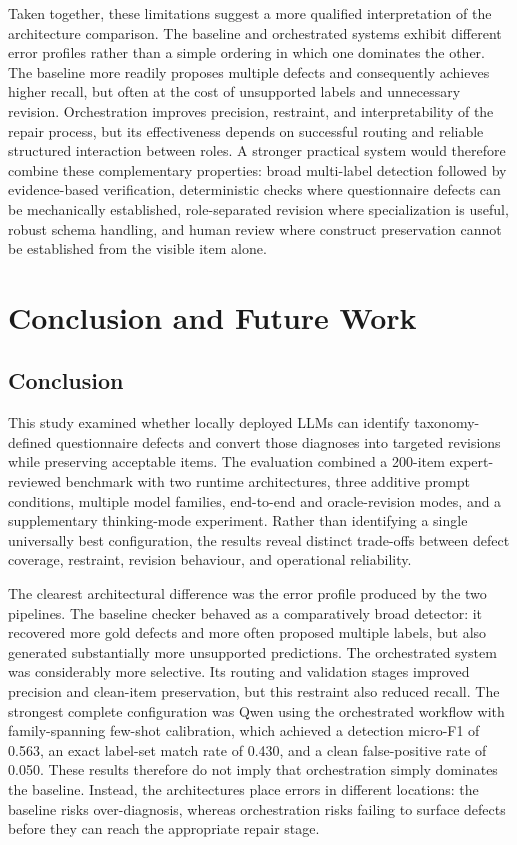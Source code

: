 \documentclass[11pt,a4paper]{article}
\begin{document}
Taken together, these limitations suggest a more qualified interpretation of the architecture comparison. The baseline and orchestrated systems exhibit different error profiles 
rather than a simple ordering in which one dominates the other. The baseline more readily proposes multiple defects and consequently achieves higher recall, but often at the cost of 
unsupported labels and unnecessary revision. Orchestration improves precision, restraint, and interpretability of the repair process, but its effectiveness depends on successful routing 
and reliable structured interaction between roles. A stronger practical system would therefore combine these complementary properties: broad multi-label detection followed by evidence-based 
verification, deterministic checks where questionnaire defects can be mechanically established, role-separated revision where specialization is useful, robust schema handling, 
and human review where construct preservation cannot be established from the visible item alone.


\section{Conclusion and Future Work}
\label{sec:conclusion}

\subsection{Conclusion}
\label{subsec:conclusion}

This study examined whether locally deployed LLMs can identify
taxonomy-defined questionnaire defects and convert those diagnoses into targeted
revisions while preserving acceptable items. The evaluation combined a
200-item expert-reviewed benchmark with two runtime architectures, three
additive prompt conditions, multiple model families, end-to-end and
oracle-revision modes, and a supplementary thinking-mode experiment. Rather
than identifying a single universally best configuration, the results reveal
distinct trade-offs between defect coverage, restraint, revision behaviour, and
operational reliability.

The clearest architectural difference was the error profile produced by the two
pipelines. The baseline checker behaved as a comparatively broad detector: it
recovered more gold defects and more often proposed multiple labels, but also
generated substantially more unsupported predictions. The orchestrated system
was considerably more selective. Its routing and validation stages improved
precision and clean-item preservation, but this restraint also reduced recall.
The strongest complete configuration was Qwen using the orchestrated workflow
with family-spanning few-shot calibration, which achieved a detection micro-F1
of 0.563, an exact label-set match rate of 0.430, and a clean false-positive
rate of 0.050. These results therefore do not imply
that orchestration simply dominates the baseline. Instead, the architectures
place errors in different locations: the baseline risks over-diagnosis,
whereas orchestration risks failing to surface defects before they can reach
the appropriate repair stage.
\end{document}
